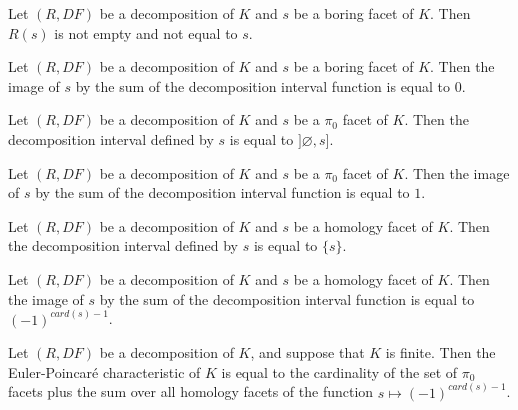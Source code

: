\begin{sublemma}
Let $(R,DF)$ be a decomposition of $K$ and $s$ be a boring facet of $K$. Then $R(s)$ is not empty and not equal to $s$.

\end{sublemma}

\begin{sublemma}
Let $(R,DF)$ be a decomposition of $K$ and $s$ be a boring facet of $K$. Then the image of $s$ by the sum of the decomposition interval function 
is equal to $0$.

\end{sublemma}

\begin{sublemma}
Let $(R,DF)$ be a decomposition of $K$ and $s$ be a $\pi_0$ facet of $K$. Then the decomposition interval defined by $s$ is equal to
$]\varnothing,s]$.

\end{sublemma}

\begin{sublemma}
Let $(R,DF)$ be a decomposition of $K$ and $s$ be a $\pi_0$ facet of $K$. Then the image of $s$ by the sum of the decomposition interval function 
is equal to $1$.

\end{sublemma}


\begin{sublemma}
Let $(R,DF)$ be a decomposition of $K$ and $s$ be a homology facet of $K$. Then the decomposition interval defined by $s$ is equal to
$\{s\}$.

\end{sublemma}

\begin{sublemma}
Let $(R,DF)$ be a decomposition of $K$ and $s$ be a homology facet of $K$. Then the image of $s$ by the sum of the decomposition interval function 
is equal to $(-1)^{card(s)-1}$.

\end{sublemma}

\begin{sublemma}[EulerPoincareCharacteristicDecomposable]
Let $(R,DF)$ be a decomposition of $K$, and suppose that $K$ is finite. Then the Euler-Poincaré characteristic of $K$ is equal to the
cardinality of the set of $\pi_0$ facets plus the sum over all homology facets of the function $s\mapsto (-1)^{card(s)-1}$.

\end{sublemma}

